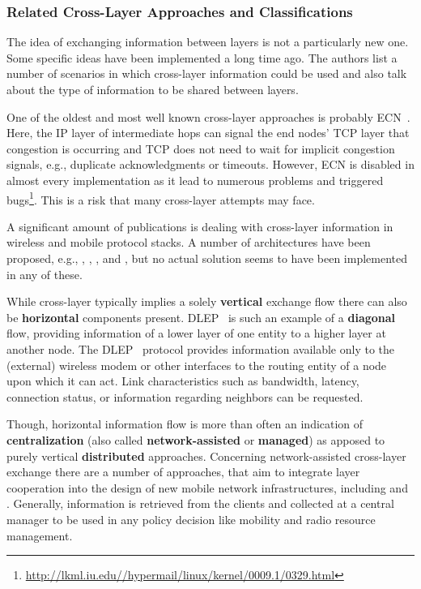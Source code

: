\subsubsection{Related Cross-Layer Approaches and Classifications}

The idea of exchanging information between layers is not a particularly new one. Some specific ideas have been implemented a long time ago. The authors \cite{Raisinghani2004720} list a number of scenarios in which cross-layer information could be used and also talk about the type of information to be shared between layers.

One of the oldest and most well known cross-layer approaches is probably \gls{ECN}~\cite{rfc3168}. Here, the \gls{IP} layer of intermediate hops can signal the end nodes' \gls{TCP} layer that congestion is occurring and \gls{TCP} does not need to wait for implicit congestion signals, e.g., duplicate acknowledgments or timeouts. However, \gls{ECN} is disabled in almost every implementation as it lead to numerous problems and triggered bugs\footnote{\url{http://lkml.iu.edu//hypermail/linux/kernel/0009.1/0329.html}}. This is a risk that many cross-layer attempts may face.

A significant amount of publications is dealing with cross-layer information in wireless and mobile protocol stacks. A number of architectures have been proposed, e.g., \cite{raisinghani2004eclair, 1580937}, \cite{wang2003multi}, \cite{1200522}, and \cite{krishna2007cross}, but no actual solution seems to have been implemented in any of these.

While cross-layer typically implies a solely \textbf{vertical} exchange flow there can also be \textbf{horizontal} components present. \gls{DLEP}~\cite{ietf2013dlepdraft} is such an example of a \textbf{diagonal} flow, providing information of a lower layer of one entity to a higher layer at another node.
The \gls{DLEP}~\cite{ietf2013dlepdraft,6379143} protocol provides information available only to the (external) wireless modem or other interfaces to the routing entity of a node upon which it can act. Link characteristics such as bandwidth, latency, connection status, or information regarding neighbors can be requested.

Though, horizontal information flow is more than often an indication of \textbf{centralization} (also called \textbf{network-assisted} or \textbf{managed}) as apposed to purely vertical \textbf{distributed} approaches. Concerning network-assisted cross-layer exchange there are a number of approaches, that aim to integrate layer cooperation into the design of new mobile network infrastructures, including \cite{zarai2010seamless} and \cite{Piamrat20111066}. Generally, information is retrieved from the clients and collected at a central manager to be used in any policy decision like mobility and radio resource management.

